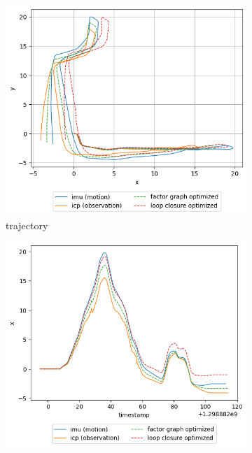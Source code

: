 \documentclass[conference]{IEEEtran}
\begin{document}
\begin{figure}[htbp]
    \centering
    \begin{subfigure}{0.24\textwidth}
        \includegraphics[width=\linewidth]{../img/trj_21.png}
        \caption{trajectory}
        \label{fig:trj_21}
    \end{subfigure}
    \hfill
    \begin{subfigure}{0.24\textwidth}
        \includegraphics[width=\linewidth]{../img/trj_21_x.png}

\end{subfigure}
\end{figure}
\end{document}

